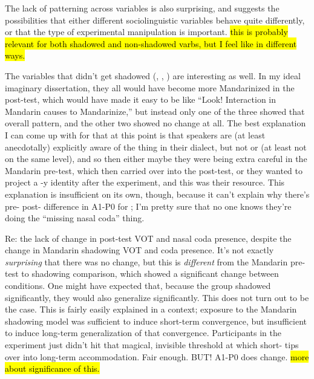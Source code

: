     The lack of patterning across variables is also surprising, and suggests the possibilities that either different sociolinguistic variables behave quite differently, or that the type of experimental manipulation is important. \hl{this is probably relevant for both shadowed and non-shadowed varbs, but I feel like in different ways.}

    The variables that didn't get shadowed (\textipa{[e]/[iE]}, \textipa{[I]/[y]}, \textipa{[l]/[n]}) are interesting as well. In my ideal imaginary dissertation, they all would have become more Mandarinized in the post-test, which would have made it easy to be like ``Look! Interaction in Mandarin causes \ND{} to Mandarinize,''  but instead only one of the three showed that overall pattern, and the other two showed no change at all. The best explanation I can come up with for that at this point is that \ND{} speakers are (at least anecdotally) explicitly aware of the \textipa{[l]/[n]} thing in their dialect, but not \textipa{[e]/[iE]} or \textipa{[I]/[y]} (at least not on the same level), and so then either maybe they were being extra careful in the Mandarin pre-test, which then carried over into the \ND{} post-test, or they wanted to project a \ND{}-y identity after the experiment, and this was their resource. This explanation is insufficient on its own, though, because it can't explain why there's pre- post- difference in A1-P0 for \ND{}; I'm pretty sure that no one knows they're doing the ``missing nasal coda'' thing.

    Re: the lack of change in \ND{} post-test VOT and nasal coda presence, despite the change in Mandarin shadowing VOT and coda presence. It's not exactly \textit{surprising} that there was no change, but this is \textit{different} from the Mandarin pre-test to shadowing comparison, which showed a significant change between conditions. One might have expected that, because the group shadowed significantly, they would also generalize significantly. This does not turn out to be the case. This is fairly easily explained in a \cbat{} context; exposure to the Mandarin shadowing model was sufficient to induce short-term convergence, but insufficient to induce long-term generalization of that convergence. Participants in the experiment just didn't hit that magical, invisible threshold at which short- tips over into long-term accommodation. Fair enough. BUT! A1-P0 does change. \hl{more about significance of this.}
    
